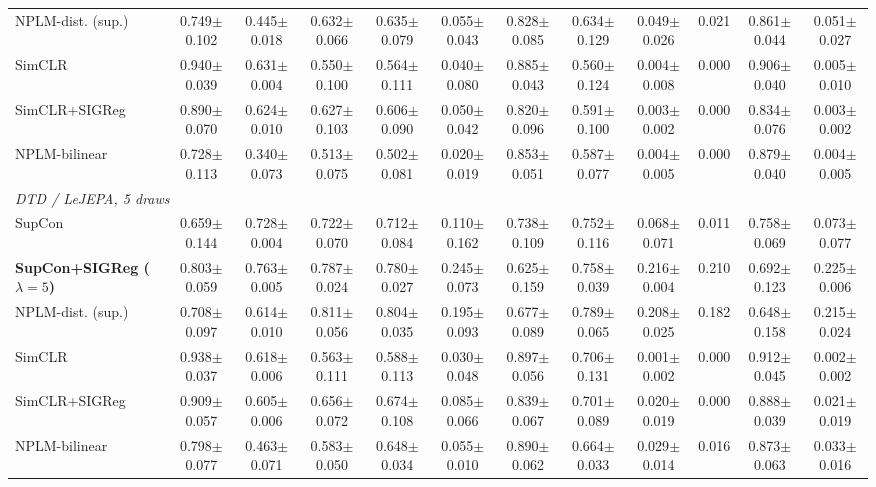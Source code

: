\begin{landscape}
\begin{center}
\begin{longtable}{lccccccccccc}
\quad NPLM-dist. (sup.) & 0.749$\pm$0.102 & 0.445$\pm$0.018 & 0.632$\pm$0.066 & 0.635$\pm$0.079 & 0.055$\pm$0.043 & 0.828$\pm$0.085 & 0.634$\pm$0.129 & 0.049$\pm$0.026 & 0.021 & 0.861$\pm$0.044 & 0.051$\pm$0.027 \\
\quad SimCLR & 0.940$\pm$0.039 & 0.631$\pm$0.004 & 0.550$\pm$0.100 & 0.564$\pm$0.111 & 0.040$\pm$0.080 & 0.885$\pm$0.043 & 0.560$\pm$0.124 & 0.004$\pm$0.008 & 0.000 & 0.906$\pm$0.040 & 0.005$\pm$0.010 \\
\quad SimCLR+SIGReg & 0.890$\pm$0.070 & 0.624$\pm$0.010 & 0.627$\pm$0.103 & 0.606$\pm$0.090 & 0.050$\pm$0.042 & 0.820$\pm$0.096 & 0.591$\pm$0.100 & 0.003$\pm$0.002 & 0.000 & 0.834$\pm$0.076 & 0.003$\pm$0.002 \\
\quad NPLM-bilinear & 0.728$\pm$0.113 & 0.340$\pm$0.073 & 0.513$\pm$0.075 & 0.502$\pm$0.081 & 0.020$\pm$0.019 & 0.853$\pm$0.051 & 0.587$\pm$0.077 & 0.004$\pm$0.005 & 0.000 & 0.879$\pm$0.040 & 0.004$\pm$0.005 \\
\multicolumn{12}{l}{\emph{DTD / LeJEPA, 5 draws}} \\
\quad SupCon & 0.659$\pm$0.144 & 0.728$\pm$0.004 & 0.722$\pm$0.070 & 0.712$\pm$0.084 & 0.110$\pm$0.162 & 0.738$\pm$0.109 & 0.752$\pm$0.116 & 0.068$\pm$0.071 & 0.011 & 0.758$\pm$0.069 & 0.073$\pm$0.077 \\
\quad \textbf{SupCon+SIGReg ($\lambda{=}5$)} & 0.803$\pm$0.059 & 0.763$\pm$0.005 & 0.787$\pm$0.024 & 0.780$\pm$0.027 & 0.245$\pm$0.073 & 0.625$\pm$0.159 & 0.758$\pm$0.039 & 0.216$\pm$0.004 & 0.210 & 0.692$\pm$0.123 & 0.225$\pm$0.006 \\
\quad NPLM-dist. (sup.) & 0.708$\pm$0.097 & 0.614$\pm$0.010 & 0.811$\pm$0.056 & 0.804$\pm$0.035 & 0.195$\pm$0.093 & 0.677$\pm$0.089 & 0.789$\pm$0.065 & 0.208$\pm$0.025 & 0.182 & 0.648$\pm$0.158 & 0.215$\pm$0.024 \\
\quad SimCLR & 0.938$\pm$0.037 & 0.618$\pm$0.006 & 0.563$\pm$0.111 & 0.588$\pm$0.113 & 0.030$\pm$0.048 & 0.897$\pm$0.056 & 0.706$\pm$0.131 & 0.001$\pm$0.002 & 0.000 & 0.912$\pm$0.045 & 0.002$\pm$0.002 \\
\quad SimCLR+SIGReg & 0.909$\pm$0.057 & 0.605$\pm$0.006 & 0.656$\pm$0.072 & 0.674$\pm$0.108 & 0.085$\pm$0.066 & 0.839$\pm$0.067 & 0.701$\pm$0.089 & 0.020$\pm$0.019 & 0.000 & 0.888$\pm$0.039 & 0.021$\pm$0.019 \\
\quad NPLM-bilinear & 0.798$\pm$0.077 & 0.463$\pm$0.071 & 0.583$\pm$0.050 & 0.648$\pm$0.034 & 0.055$\pm$0.010 & 0.890$\pm$0.062 & 0.664$\pm$0.033 & 0.029$\pm$0.014 & 0.016 & 0.873$\pm$0.063 & 0.033$\pm$0.016 \\

\end{longtable}
\end{center}
\end{landscape}
